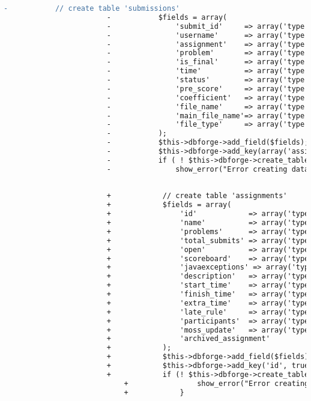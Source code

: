 \begin{lstlisting}[language=diff, caption=Perubahan pada kode Install.php]
						-			// create table 'submissions'
						-			$fields = array(
						-				'submit_id'     => array('type' => 'INT', 'constraint' => 11, 'unsigned' => TRUE),
						-				'username'      => array('type' => 'VARCHAR', 'constraint' => 20),
						-				'assignment'    => array('type' => 'SMALLINT', 'constraint' => 4, 'unsigned' => TRUE),
						-				'problem'       => array('type' => 'SMALLINT', 'constraint' => 4, 'unsigned' => TRUE),
						-				'is_final'      => array('type' => 'TINYINT', 'constraint' => 1, 'default' => 0),
						-				'time'          => array('type' => $DATETIME),
						-				'status'        => array('type' => 'VARCHAR', 'constraint' => 100),
						-				'pre_score'     => array('type' => 'INT', 'constraint' => 11),
						-				'coefficient'   => array('type' => 'VARCHAR', 'constraint' => 6),
						-				'file_name'     => array('type' => 'VARCHAR', 'constraint' => 100),
						-				'main_file_name'=> array('type' => 'VARCHAR', 'constraint' => 100),
						-				'file_type'     => array('type' => 'VARCHAR', 'constraint' => 6),
						-			);
						-			$this->dbforge->add_field($fields);
						-			$this->dbforge->add_key(array('assignment', 'submit_id'));
						-			if ( ! $this->dbforge->create_table('submissions', TRUE))
						-				show_error("Error creating database table ".$this->db->dbprefix('submissions'));
						
						
						+            // create table 'assignments'
						+            $fields = array(
						+                'id'            => array('type' => 'INT', 'constraint' => 11, 'unsigned' => true, 'auto_increment' => true),
						+                'name'          => array('type' => 'VARCHAR', 'constraint' => 50, 'default' => ''),
						+                'problems'      => array('type' => 'SMALLINT', 'constraint' => 4, 'unsigned' => true),
						+                'total_submits' => array('type' => 'INT', 'constraint' => 11, 'unsigned' => true),
						+                'open'          => array('type' => 'TINYINT', 'constraint' => 1),
						+                'scoreboard'    => array('type' => 'TINYINT', 'constraint' => 1),
						+                'javaexceptions' => array('type' => 'TINYINT', 'constraint' => 1),
						+                'description'   => array('type' => 'TEXT'),
						+                'start_time'    => array('type' => $DATETIME),
						+                'finish_time'   => array('type' => $DATETIME),
						+                'extra_time'    => array('type' => 'INT', 'constraint' => 11),
						+                'late_rule'     => array('type' => 'TEXT'),
						+                'participants'  => array('type' => 'TEXT'),
						+                'moss_update'   => array('type' => 'VARCHAR', 'constraint' => 30, 'default' => 'Never'),
						+                'archived_assignment'          => array('type' => 'TINYINT', 'constraint' => 1),
						+            );
						+            $this->dbforge->add_field($fields);
						+            $this->dbforge->add_key('id', true); // PRIMARY KEY
						+            if (! $this->dbforge->create_table('assignments', true)) {
							+                show_error("Error creating database table ".$this->db->dbprefix('assignments'));
							+            }
						

\end{lstlisting}
